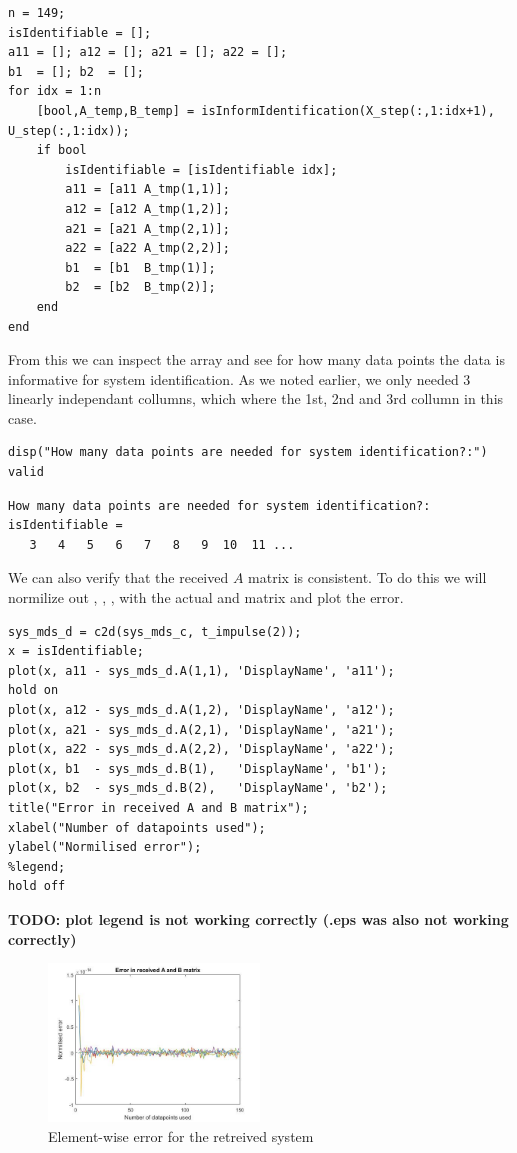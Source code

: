 \begin{lstlisting}
n = 149;
isIdentifiable = [];
a11 = []; a12 = []; a21 = []; a22 = [];
b1  = []; b2  = [];
for idx = 1:n
    [bool,A_temp,B_temp] = isInformIdentification(X_step(:,1:idx+1), U_step(:,1:idx));
    if bool
        isIdentifiable = [isIdentifiable idx];
        a11 = [a11 A_tmp(1,1)];
        a12 = [a12 A_tmp(1,2)];
        a21 = [a21 A_tmp(2,1)];
        a22 = [a22 A_tmp(2,2)];
        b1  = [b1  B_tmp(1)];
        b2  = [b2  B_tmp(2)];
    end
end
\end{lstlisting}

From this we can inspect the  array and see for how many data points the data is informative for system identification. As we noted earlier, we only needed 3 linearly independant collumns, which where the 1st, 2nd and 3rd collumn in this case.

\begin{lstlisting}
disp("How many data points are needed for system identification?:")
valid
\end{lstlisting}

\begin{verbatim}
How many data points are needed for system identification?:
isIdentifiable =
   3   4   5   6   7   8   9  10  11 ...
\end{verbatim}

We can also verify that the received $A$ matrix is consistent. To do this we will normilize out , , ,  with the actual  and  matrix and plot the error.

\begin{lstlisting}
sys_mds_d = c2d(sys_mds_c, t_impulse(2));
x = isIdentifiable;
plot(x, a11 - sys_mds_d.A(1,1), 'DisplayName', 'a11');
hold on
plot(x, a12 - sys_mds_d.A(1,2), 'DisplayName', 'a12');
plot(x, a21 - sys_mds_d.A(2,1), 'DisplayName', 'a21');
plot(x, a22 - sys_mds_d.A(2,2), 'DisplayName', 'a22');
plot(x, b1  - sys_mds_d.B(1),   'DisplayName', 'b1');
plot(x, b2  - sys_mds_d.B(2),   'DisplayName', 'b2');
title("Error in received A and B matrix");
xlabel("Number of datapoints used");
ylabel("Normilised error");
%legend;
hold off
\end{lstlisting}

\textbf{TODO: plot legend is not working correctly (.eps was also not working correctly)}

\begin{figure}[H]
	\centering
	\includegraphics[width=0.5\textwidth]{Latex/image/ex-msd/lessData.jpg}
	\caption{Element-wise error for the retreived system}
\end{figure}

